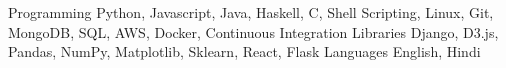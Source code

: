 
\begin{cvskills}

  \cvskill
    {Programming}
    {Python, Javascript, Java, Haskell, C, Shell Scripting, Linux, Git, MongoDB, SQL, AWS, Docker, Continuous Integration}
  \cvskill
    {Libraries}
    {Django, D3.js, Pandas, NumPy, Matplotlib, Sklearn, React, Flask}
  \cvskill
    {Languages}
    {English, Hindi}
\end{cvskills}
